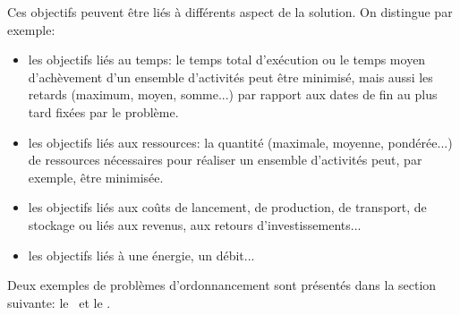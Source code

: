 Ces objectifs peuvent être liés à différents aspect de la solution. On
distingue par exemple:
\begin{itemize}
\item les objectifs liés au temps: le temps total d'exécution ou le temps moyen
  d'achèvement d'un ensemble d'activités peut être minimisé, mais
  aussi  les retards (maximum, moyen, somme...) par rapport
  aux dates de fin au plus tard fixées par le problème.
\item les objectifs liés aux ressources: la quantité (maximale,
  moyenne, pondérée...) de ressources nécessaires pour réaliser un
  ensemble d'activités peut, par exemple, être minimisée.
\item les objectifs liés aux coûts de lancement, de production, de
  transport, de stockage ou liés aux revenus, aux retours
  d'investissements... 
\item les objectifs liés à une énergie, un débit...
\end{itemize}

Deux exemples de problèmes d'ordonnancement sont présentés dans la
section suivante: le \RCPSP~et le \CUSP.
